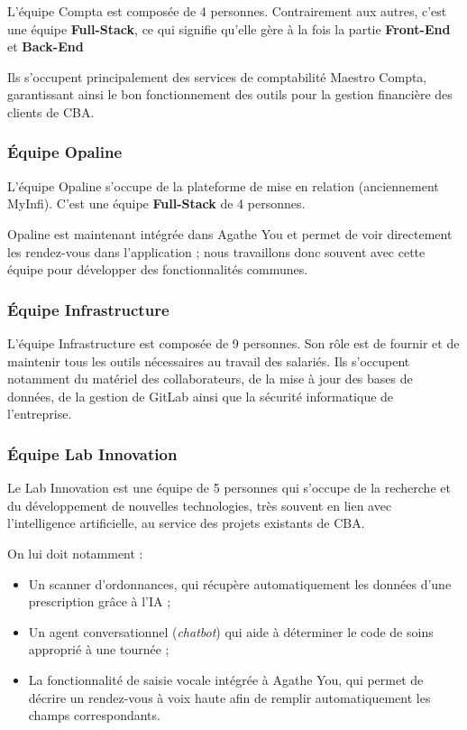\documentclass{article}
\begin{document}
L'équipe Compta est composée de 4 personnes. Contrairement aux autres, c'est une équipe \textbf{Full-Stack}, ce qui signifie qu'elle gère à la fois la partie \textbf{Front-End} et \textbf{Back-End}

Ils s'occupent principalement des services de comptabilité Maestro Compta, garantissant ainsi le bon fonctionnement des outils pour la gestion financière des clients de CBA.

\subsubsection{Équipe Opaline}

L'équipe Opaline s'occupe de la plateforme de mise en relation (anciennement MyInfi). C'est une équipe \textbf{Full-Stack} de 4 personnes.

Opaline est maintenant intégrée dans Agathe You et permet de voir directement les rendez-vous dans l'application ; nous travaillons donc souvent avec cette équipe pour développer des fonctionnalités communes.

\subsubsection{Équipe Infrastructure}

L'équipe Infrastructure est composée de 9 personnes. Son rôle est de fournir et de maintenir tous les outils nécessaires au travail des salariés. Ils s'occupent notamment du matériel des collaborateurs, de la mise à jour des bases de données, de la gestion de GitLab ainsi que la sécurité informatique de l'entreprise.

\subsubsection{Équipe Lab Innovation}

Le Lab Innovation est une équipe de 5 personnes qui s'occupe de la recherche et du développement de nouvelles technologies, très souvent en lien avec l'intelligence artificielle, au service des projets existants de CBA.

On lui doit notamment :

\begin{itemize}
    \item Un scanner d'ordonnances, qui récupère automatiquement les données d'une prescription grâce à l'IA ;
    \item Un agent conversationnel (\textit{chatbot}) qui aide à déterminer le code de soins approprié à une tournée ;
    \item La fonctionnalité de saisie vocale intégrée à Agathe You, qui permet de décrire un rendez-vous à voix haute afin de remplir automatiquement les champs correspondants.
\end{itemize}
\end{document}
